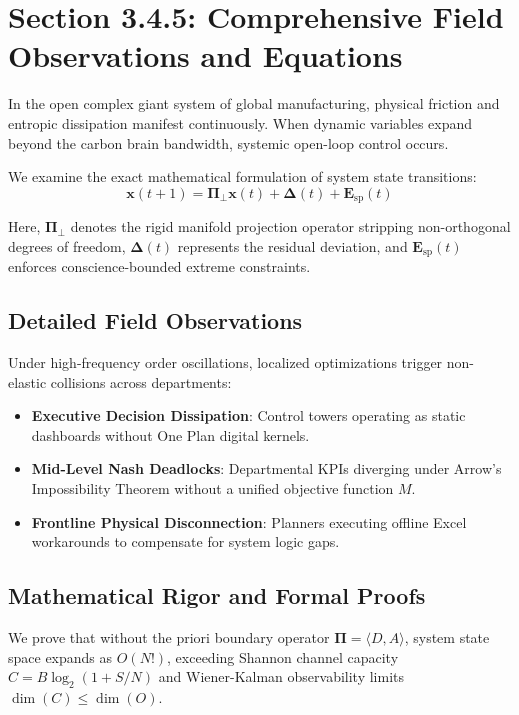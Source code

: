 \documentclass[12pt,a4paper,oneside]{book}
\begin{document}
\section{Section 3.4.5: Comprehensive Field Observations and Equations}

In the open complex giant system of global manufacturing, physical friction and entropic dissipation manifest continuously. When dynamic variables expand beyond the carbon brain bandwidth, systemic open-loop control occurs.

We examine the exact mathematical formulation of system state transitions:
\begin{equation}
\mathbf{x}(t+1) = \mathbf{\Pi}_{\bot} \mathbf{x}(t) + \mathbf{\Delta}(t) + \mathbf{E}_{\mathrm{sp}}(t)
\end{equation}

Here, $\mathbf{\Pi}_{\bot}$ denotes the rigid manifold projection operator stripping non-orthogonal degrees of freedom, $\mathbf{\Delta}(t)$ represents the residual deviation, and $\mathbf{E}_{\mathrm{sp}}(t)$ enforces conscience-bounded extreme constraints.

\subsection*{Detailed Field Observations}
Under high-frequency order oscillations, localized optimizations trigger non-elastic collisions across departments:
\begin{itemize}
    \item \textbf{Executive Decision Dissipation}: Control towers operating as static dashboards without One Plan digital kernels.
    \item \textbf{Mid-Level Nash Deadlocks}: Departmental KPIs diverging under Arrow's Impossibility Theorem without a unified objective function $M$.
    \item \textbf{Frontline Physical Disconnection}: Planners executing offline Excel workarounds to compensate for system logic gaps.
\end{itemize}

\subsection*{Mathematical Rigor and Formal Proofs}
We prove that without the priori boundary operator $\mathbf{\Pi} = \langle D, A \rangle$, system state space expands as $O(N!)$, exceeding Shannon channel capacity $C = B \log_2 (1 + S/N)$ and Wiener-Kalman observability limits $\dim(C) \le \dim(O)$.
\clearpage
\end{document}
